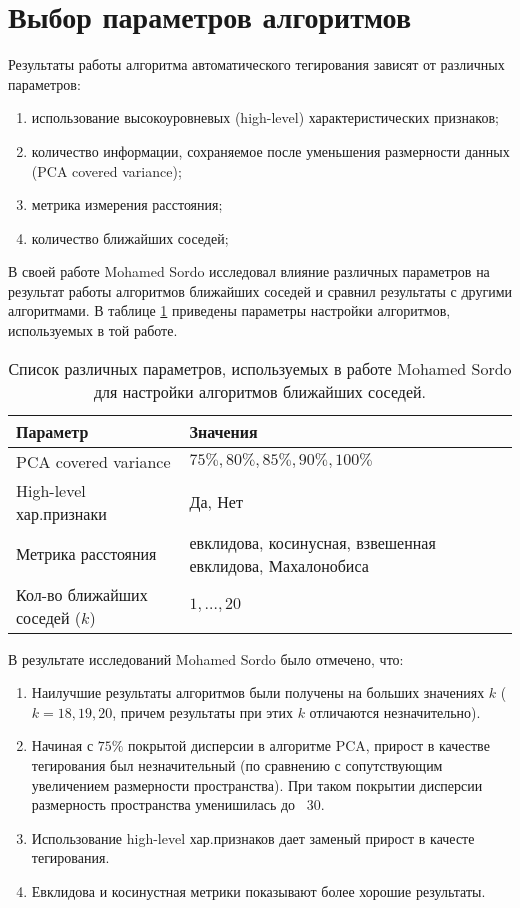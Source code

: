 \section{Выбор параметров алгоритмов}

Результаты работы алгоритма автоматического тегирования зависят от различных параметров:
\begin{enumerate}
 \item использование высокоуровневых (high-level) характеристических признаков;
 \item количество информации, сохраняемое после уменьшения размерности данных (PCA covered variance);
 \item метрика измерения расстояния;
 \item количество ближайших соседей;
\end{enumerate}

В своей работе Mohamed Sordo исследовал влияние различных параметров на результат работы алгоритмов ближайших соседей 
и сравнил результаты с другими алгоритмами. В таблице \ref{tab:old_algo_settings} приведены параметры настройки алгоритмов, используемых в той работе.
\begin{table}[ht]
\centering
\captionsetup{justification=centering}
\caption{Список различных параметров, используемых в работе Mohamed Sordo для настройки алгоритмов ближайших соседей.}
\label{tab:old_algo_settings}
\begin{tabular}{ p{5cm}  p{4cm} }
  \hline    
  Параметр & Значения \\
  \hline    
  PCA covered variance & $75\%, 80\%, 85\%, 90\%, 100\% $ \\
  High-level хар.признаки & Да, Нет \\
  Метрика расстояния & евклидова, косинусная, взвешенная евклидова, Махалонобиса\\
  Кол-во ближайших соседей ($k$) & $1, \ldots, 20$ \\
  \hline    
\end{tabular}
\end{table}

В результате исследований Mohamed Sordo было отмечено, что:
\begin{enumerate}
 \item Наилучшие результаты алгоритмов были получены на больших значениях $k$ ($k = 18, 19, 20$, причем результаты при этих $k$ отличаются незначительно).
 \item Начиная с $75\%$ покрытой дисперсии в алгоритме PCA, прирост в качестве тегирования был незначительный (по сравнению с сопутствующим увеличением размерности пространства).
 При таком покрытии дисперсии размерность пространства уменишилась до ~30.
 \item Использование high-level хар.признаков дает заменый прирост в качесте тегирования.
 \item Евклидова и косинустная метрики показывают более хорошие результаты.
\end{enumerate}

